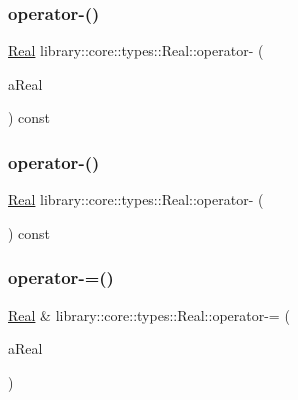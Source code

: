 \subsubsection{\texorpdfstring{operator-\/()}{operator-()}\hspace{0.1cm}{\footnotesize\ttfamily [2/3]}}
{\footnotesize\ttfamily \hyperlink{classlibrary_1_1core_1_1types_1_1Real}{Real} library\+::core\+::types\+::\+Real\+::operator-\/ (\begin{DoxyParamCaption}\item[{const \hyperlink{classlibrary_1_1core_1_1types_1_1Real_a9c5c8826b7e5a8e39544d23fea6c0e1c}{Real\+::\+Value\+Type} \&}]{a\+Real }\end{DoxyParamCaption}) const}

\mbox{\label{classlibrary_1_1core_1_1types_1_1Real_a7a018943c5110e4023f5e462eed70a25}} 
\subsubsection{\texorpdfstring{operator-\/()}{operator-()}\hspace{0.1cm}{\footnotesize\ttfamily [3/3]}}
{\footnotesize\ttfamily \hyperlink{classlibrary_1_1core_1_1types_1_1Real}{Real} library\+::core\+::types\+::\+Real\+::operator-\/ (\begin{DoxyParamCaption}{ }\end{DoxyParamCaption}) const}

\mbox{\label{classlibrary_1_1core_1_1types_1_1Real_a91b116698504125c3e9063e5b457f3fe}} 
\subsubsection{\texorpdfstring{operator-\/=()}{operator-=()}\hspace{0.1cm}{\footnotesize\ttfamily [1/2]}}
{\footnotesize\ttfamily \hyperlink{classlibrary_1_1core_1_1types_1_1Real}{Real} \& library\+::core\+::types\+::\+Real\+::operator-\/= (\begin{DoxyParamCaption}\item[{const \hyperlink{classlibrary_1_1core_1_1types_1_1Real}{Real} \&}]{a\+Real }\end{DoxyParamCaption})}

